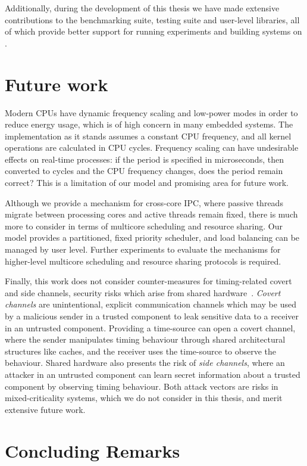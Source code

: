Additionally, during the development of this thesis we have made extensive contributions to the 
\selfour benchmarking suite, testing suite and user-level libraries, all of which provide better 
support for running experiments and building systems on \selfour. 

\section{Future work}

Modern \glspl{CPU} have dynamic frequency scaling and low-power modes in order to reduce energy usage, which
is of high concern in many embedded systems. The implementation as it stands assumes a constant
\gls{CPU} frequency, and all kernel operations are calculated in \gls{CPU} cycles. Frequency scaling
can have undesirable effects on real-time processes: if the period is specified in microseconds, then
converted to cycles and the CPU frequency changes, does the period remain correct? This is a
limitation of our model and promising area for future work.

Although we provide a mechanism for cross-core IPC, where passive threads migrate between processing
cores and active threads remain fixed, there is much more to consider in terms of multicore
scheduling and resource sharing. Our model provides a partitioned, fixed priority scheduler, and 
load balancing can be managed by user level. Further experiments to evaluate the mechanisms for higher-level
multicore scheduling and resource sharing protocols is required. 

Finally, this work does not consider counter-measures for timing-related covert and side channels,
security risks which arise from
shared hardware~\citep{Ge_YCH_18}. \emph{Covert channels} are unintentional, explicit communication
channels which may be used by a malicious sender in a trusted component to leak sensitive data to a receiver
in an untrusted component. Providing a time-source can open a covert channel, where the sender
manipulates timing behaviour through shared architectural structures like caches, and the receiver
uses the time-source to observe the behaviour. Shared hardware also presents the risk of
\emph{side channels}, 
where an attacker in an untrusted
component can learn secret information about a trusted component by observing timing behaviour. 
Both attack vectors are risks in mixed-criticality systems, which we do not consider in this
thesis, and merit extensive future work. 

\section{Concluding Remarks}

